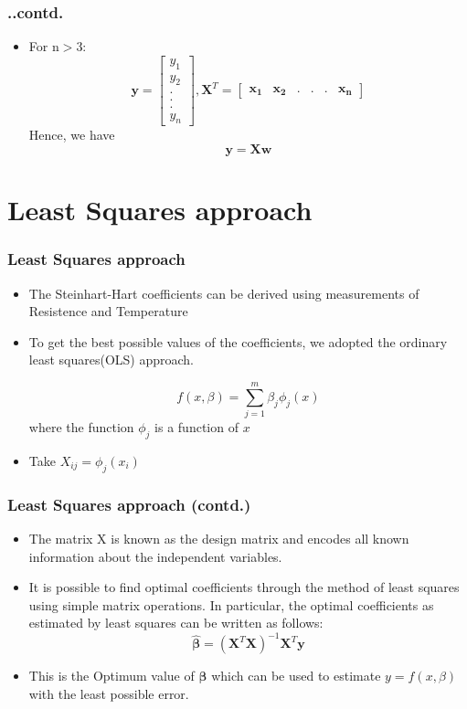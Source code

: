 \documentclass{beamer}
\let\vec\mathbf
\begin{document}
\begin{frame}
\frametitle{..contd.}
\begin{itemize}
\item For n$>$3: 
    \[
    \vec{y} = \begin{bmatrix}y_{1}\\y_{2}\\.\\.\\.\\y_{n}\end{bmatrix} , 
    \vec{X}^{T} = 
    \begin{bmatrix}
    \vec{x_{1}}&\vec{x_{2}}&.&.&.&\vec{x_{n}} 
    \end{bmatrix}  
    \] 
Hence, we have 
	\[
	\vec{y} = \vec{X}\vec{w}
	\]
\end{itemize}
\end{frame}
 \section{Least Squares approach}
 \begin{frame}
\frametitle{Least Squares approach}
\begin{itemize}


\item
The Steinhart-Hart coefficients can be derived using measurements of Resistence and Temperature

\item
To get the best possible values of the coefficients, we adopted the ordinary least squares(OLS) approach.

\[f(x, \beta) = \sum_{j = 1}^m \beta_j \phi_j(x)\] 
where the function $\phi_j$ is a function of $x$

\item
Take $X_{ij}= \phi_j(x_{i})$
\end{itemize}
\end{frame}

\begin{frame}
\frametitle{Least Squares approach (contd.)}
\begin{itemize}
\item
The matrix X is known as the design matrix and encodes all known information about the independent variables. 
\item
It is possible to find optimal coefficients through the method of least squares using simple matrix operations. In particular, the optimal coefficients \boldsymbol{\hat\beta} as estimated by least squares can be written as follows: 
\[
\boldsymbol{\hat\beta} =( \vec{X} ^{T} \vec{X})^{-1}\vec{X}^T \vec{y}
 \] 
\item
This is the Optimum value of $\boldsymbol{\beta}$ which can be used to estimate  $y =f(x, \beta)$ with the least possible error.
\end{itemize}
\end{frame}
\end{document}
